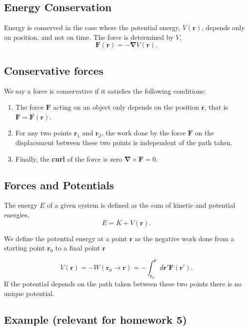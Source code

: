 \documentclass[%
oneside,                 %
final,                   %
10pt]{article}
\begin{document}
\subsection{Energy Conservation}
Energy is conserved in the case where the potential energy, $V(\bm{r})$, depends only on position, and not on time. The force is determined by $V$,
\begin{equation}
\bm{F}(\bm{r})=-\bm{\nabla} V(\bm{r}).
\end{equation}

\subsection{Conservative forces}

We say a force is conservative if it satisfies the following conditions:
\begin{enumerate}
\item The force $\bm{F}$ acting on an object only depends on the position $\bm{r}$, that is $\bm{F}=\bm{F}(\bm{r})$.

\item For any two points $\bm{r}_1$ and $\bm{r}_2$, the work done by the force $\bm{F}$ on the displacement between these two points is independent of the path taken.

\item Finally, the \textbf{curl} of the force is zero $\bm{\nabla}\times\bm{F}=0$.
\end{enumerate}

\noindent
\subsection{Forces and Potentials}

The energy $E$ of a given system is defined as the sum of kinetic and potential energies,
\[
E=K+V(\bm{r}).
\]

We define the potential energy at a point $\bm{r}$ as the negative work done from a starting point $\bm{r}_0$ to a final point $\bm{r}$ 

\[
V(\bm{r})=-W(\bm{r}_0\rightarrow\bm{r})= -\int_{\bm{r}_0}^{\bm{r}}d\bm{r}'\bm{F}(\bm{r}').
\]
If the potential depends on the path taken between these two points there is no unique potential.

\subsection{Example (relevant for homework 5)}
\end{document}
